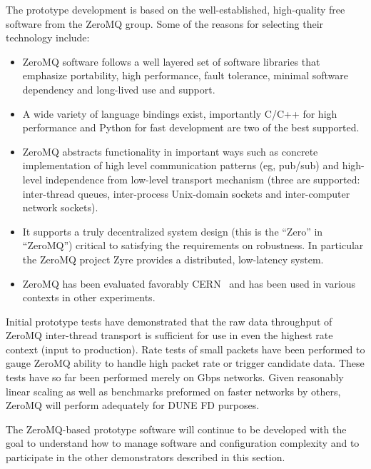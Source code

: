 The prototype development is based on the well-established, high-quality free software from the ZeroMQ group.
Some of the reasons for selecting their technology include:
\begin{itemize}
\item ZeroMQ software follows a well layered set of software libraries that emphasize portability, high performance, fault tolerance, minimal software dependency and long-lived use and support.
\item A wide variety of language bindings exist, importantly C/C++ for high performance and Python for fast development are two of the best supported.
\item ZeroMQ abstracts functionality in important ways such as concrete implementation of high level communication patterns (eg, pub/sub) and high-level independence from low-level transport mechanism (three are supported: inter-thread queues, inter-process Unix-domain sockets and inter-computer network sockets). 
\item It supports a truly decentralized system design (this is the ``Zero'' in ``ZeroMQ'') critical to satisfying the requirements on robustness.  In particular the ZeroMQ project Zyre provides a distributed, low-latency  system.
\item ZeroMQ has been evaluated favorably CERN~\cite{Dworak:2012mf} and has been used in various  contexts in other experiments.
\end{itemize}

Initial prototype tests have demonstrated that the raw data throughput of ZeroMQ inter-thread transport is sufficient for use in even the highest rate  context (input to  production).
Rate tests of small packets have been performed to gauge ZeroMQ ability to handle high packet rate  or trigger candidate data. 
These tests have so far been performed merely on Gbps networks. 
Given reasonably linear scaling as well as benchmarks preformed on faster networks by others, ZeroMQ will perform adequately for DUNE FD  purposes.

The ZeroMQ-based prototype software will continue to be developed with the goal to understand how to manage software and configuration complexity and to participate in the other demonstrators described in this section. 



